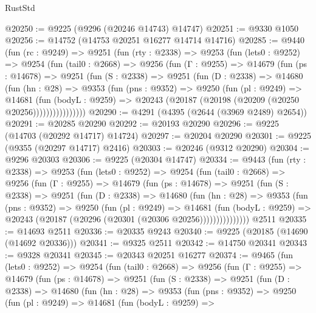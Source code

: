\begin{lexlean}{RustStd}
\begin{coremodule}
@20250 := @9225 (@9296 (@20246 @14743) @14747)
@20251 := @9330 @1050
@20256 := @14752 (@14753 @20251 @16277 @14714 @14716)
@20285 := @9440
    (fun (rc : @9249) =>
    @9251
      (fun (rty : @2338) =>
      @9253
        (fun (lets0 : @9252) =>
        @9254
          (fun (tail0 : @2668) =>
          @9256
            (fun (Γ : @9255) =>
            @14679
              (fun (ps : @14678) =>
              @9251
                (fun (S : @2338) =>
                @9251
                  (fun (D : @2338) =>
                  @14680
                    (fun (hn : @28) =>
                    @9353
                      (fun (pns : @9352) =>
                      @9250
                        (fun (pl : @9249) =>
                        @14681
                          (fun (bodyL : @9259) =>
                          @20243 (@20187 (@20198 (@20209 (@20250 @20256))))))))))))))))
@20290 := @4291 (@4395 (@2644 (@3969 @2489) @2654))
@20291 := @20285 @20290
@20292 := @20193 @20290
@20296 := @9225 (@14703 (@20292 @14717) @14724)
@20297 := @20204 @20290
@20301 := @9225 (@9355 (@20297 @14717) @2416)
@20303 := @20246 (@9312 @20290)
@20304 := @9296 @20303
@20306 := @9225 (@20304 @14747)
@20334 := @9443
    (fun (rty : @2338) =>
    @9253
      (fun (lets0 : @9252) =>
      @9254
        (fun (tail0 : @2668) =>
        @9256
          (fun (Γ : @9255) =>
          @14679
            (fun (ps : @14678) =>
            @9251
              (fun (S : @2338) =>
              @9251
                (fun (D : @2338) =>
                @14680
                  (fun (hn : @28) =>
                  @9353
                    (fun (pns : @9352) =>
                    @9250
                      (fun (pl : @9249) =>
                      @14681
                        (fun (bodyL : @9259) =>
                        @20243 (@20187 (@20296 (@20301 (@20306 @20256)))))))))))))))
    @2511
@20335 := @14693 @2511
@20336 := @20335 @9243
@20340 := @9225 (@20185 (@14690 (@14692 @20336)))
@20341 := @9325 @2511
@20342 := @14750 @20341
@20343 := @9328 @20341
@20345 := @20343 @20251 @16277
@20374 := @9465
    (fun (lets0 : @9252) =>
    @9254
      (fun (tail0 : @2668) =>
      @9256
        (fun (Γ : @9255) =>
        @14679
          (fun (ps : @14678) =>
          @9251
            (fun (S : @2338) =>
            @9251
              (fun (D : @2338) =>
              @14680
                (fun (hn : @28) =>
                @9353
                  (fun (pns : @9352) =>
                  @9250
                    (fun (pl : @9249) =>
                    @14681
                      (fun (bodyL : @9259) =>

\end{coremodule}
\end{lexlean}
